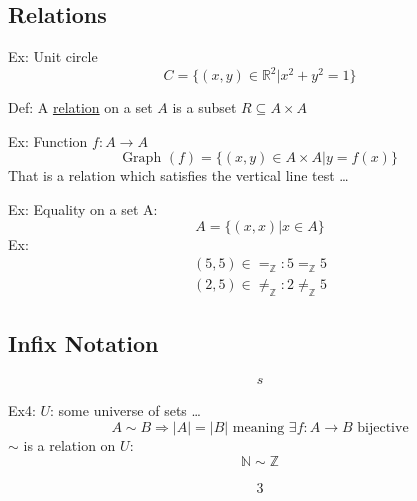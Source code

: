 \documentclass{article}
\begin{document}
\subsection{Relations}
Ex: Unit circle
\[C = \{(x,y) \in \mathbb{R}^2 | x^2 + y^2 = 1\}\]

Def: A \underline{relation} on a set $A$ is a subset $R \subseteq A \times A$

Ex: Function $f: A \rightarrow A$
\[\text{Graph } (f) = \{(x,y) \in A \times A | y = f(x)\}\]
That is a relation which satisfies the vertical line test \ldots

Ex: Equality on a set A:
\[A = \{(x, x) | x\in A\}\]
Ex:
\begin{align}
    (5,5) \in =_\mathbb{Z} : 5 =_\mathbb{Z} 5 \\
    (2,5) \in \neq_\mathbb{Z} : 2 \neq_\mathbb{Z} 5
\end{align}

\subsection{Infix Notation}
\begin{align}
    s
\end{align}

Ex4: $U$: some universe of sets \ldots
\[A \sim B \Rightarrow |A| = |B| \text{ meaning } \exists f: A \rightarrow B \text{ bijective}\]
$\sim$ is a relation on $U$:
\[\mathbb{N} \sim \mathbb{Z}\]

\begin{align}
    3
\end{align}
\end{document}
